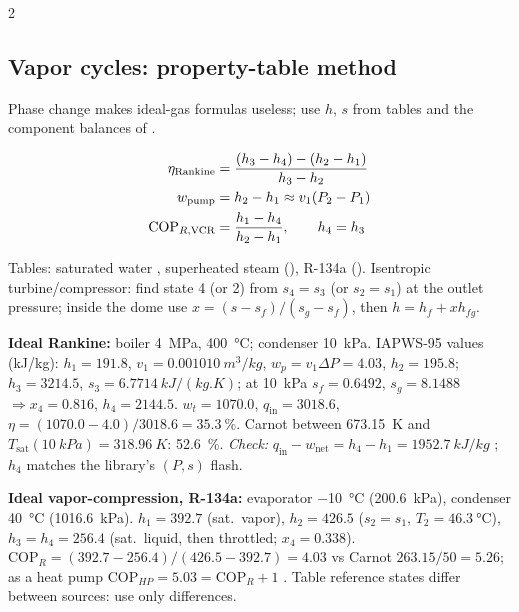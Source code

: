 \begin{multicols}{2}
\subsection{Vapor cycles: property-table method}\label{sec:vaporcycles}
\CORE{} Phase change makes ideal-gas formulas useless; use $h$, $s$ from tables and the component balances of .
\begin{formulabox}
\vspace{-6pt}
\begin{align}
\eta_{\text{Rankine}} &= \frac{(h_3-h_4)-(h_2-h_1)}{h_3-h_2} \label{F:cycle:rankine}\\
w_{\text{pump}} &= h_2-h_1\approx v_1(P_2-P_1) \notag\\
\mathrm{COP}_{R,\text{VCR}} &= \frac{h_1-h_4}{h_2-h_1},\qquad h_4=h_3 \label{F:cycle:vcr}
\end{align}
\end{formulabox}
Tables: saturated water , superheated steam  (), R-134a  (). Isentropic turbine/compressor: find state 4 (or 2) from $s_4=s_3$ (or $s_2=s_1$) at the outlet pressure; inside the dome use $x=(s-s_f)/(s_g-s_f)$, then $h=h_f+xh_{fg}$.

\begin{demobox}\textbf{Ideal Rankine:} boiler \SI{4}{MPa}, \SI{400}{\celsius}; condenser \SI{10}{kPa}. IAPWS-95 values (\si{kJ/kg}): $h_1=191.8$, $v_1=\SI{0.001010}{m^3/kg}$, $w_p=v_1\Delta P=4.03$, $h_2=195.8$; $h_3=3214.5$, $s_3=\SI{6.7714}{kJ/(kg.K)}$; at \SI{10}{kPa} $s_f=0.6492$, $s_g=8.1488$ $\Rightarrow x_4=0.816$, $h_4=2144.5$.
$w_t=1070.0$, $q_{\text{in}}=3018.6$, $\eta=(1070.0-4.0)/3018.6=\SI{35.3}{\percent}$. Carnot between \SI{673.15}{K} and $T_{\text{sat}}(\SI{10}{kPa})=\SI{318.96}{K}$: \SI{52.6}{\percent}. \emph{Check:} $q_{\text{in}}-w_{\text{net}}=h_4-h_1=\SI{1952.7}{kJ/kg}$ \checkmark; $h_4$ matches the library's $(P,s)$ flash.\end{demobox}

\begin{demobox}\textbf{Ideal vapor-compression, R-134a:} evaporator \SI{-10}{\celsius} (\SI{200.6}{kPa}), condenser \SI{40}{\celsius} (\SI{1016.6}{kPa}). $h_1=392.7$ (sat.\ vapor), $h_2=426.5$ ($s_2=s_1$, $T_2=\SI{46.3}{\celsius}$), $h_3=h_4=256.4$ (sat.\ liquid, then throttled; $x_4=0.338$).
$\mathrm{COP}_R=(392.7-256.4)/(426.5-392.7)=4.03$ vs Carnot $263.15/50=5.26$; as a heat pump $\mathrm{COP}_{HP}=5.03=\mathrm{COP}_R+1$ \checkmark. Table reference states differ between sources: use only differences.\end{demobox}


\end{multicols}
